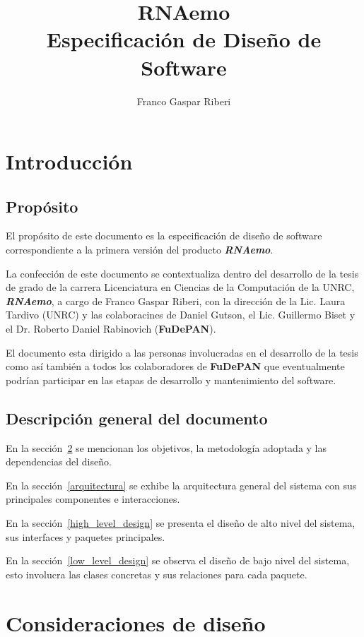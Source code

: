 \documentclass[12pt,a4paper,spanish]{article}
\title{\textbf{RNAemo}\\ \vspace{0.45cm} Especificación de Diseño de Software}
\author{Franco Gaspar Riberi}
\begin{document}
\maketitle\pagebreak{}\tableofcontents{}\pagebreak{}

\newpage

\section{Introducción}
\subsection{Propósito}

El propósito de este documento es la especificación de
diseño de software correspondiente a la primera versión del producto 
\emph{\textbf{RNAemo}}.

La confección de este documento se contextualiza dentro del desarrollo de la tesis
de grado de la carrera Licenciatura en Ciencias de la Computación de la UNRC,
\emph{\textbf{RNAemo}}, a cargo de Franco Gaspar Riberi, con la dirección
de la Lic. Laura Tardivo (UNRC) y las colaboracines de Daniel
Gutson, el Lic. Guillermo Biset y el Dr. Roberto Daniel Rabinovich
(\textbf{FuDePAN}).

El documento esta dirigido a las personas involucradas en el desarrollo de la
tesis como así también a todos los colaboradores de \textbf{FuDePAN} que eventualmente
podrían participar en las etapas de desarrollo y mantenimiento del software.

\subsection{Descripci\'on general del documento}
En la sección~\ref{consideraciones} se mencionan los objetivos, la
metodología adoptada y las dependencias del diseño.

En la sección~\ref{arquitectura} se exhibe la arquitectura general del
sistema con sus principales componentes e interacciones.

En la sección~\ref{high_level_design} se presenta el diseño de alto nivel del sistema,
sus interfaces y paquetes principales.
				    
En la sección~\ref{low_level_design} se observa el diseño de bajo nivel del sistema,
esto involucra las clases concretas y sus relaciones para cada paquete.

\section{Consideraciones de diseño}
\label{consideraciones}
\end{document}
